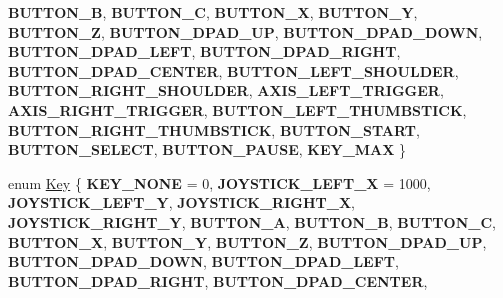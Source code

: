 \begin{DoxyCompactItemize}
\newline
{\bfseries B\+U\+T\+T\+O\+N\+\_\+B}, 
{\bfseries B\+U\+T\+T\+O\+N\+\_\+C}, 
{\bfseries B\+U\+T\+T\+O\+N\+\_\+X}, 
{\bfseries B\+U\+T\+T\+O\+N\+\_\+Y}, 
\newline
{\bfseries B\+U\+T\+T\+O\+N\+\_\+Z}, 
{\bfseries B\+U\+T\+T\+O\+N\+\_\+\+D\+P\+A\+D\+\_\+\+UP}, 
{\bfseries B\+U\+T\+T\+O\+N\+\_\+\+D\+P\+A\+D\+\_\+\+D\+O\+WN}, 
{\bfseries B\+U\+T\+T\+O\+N\+\_\+\+D\+P\+A\+D\+\_\+\+L\+E\+FT}, 
\newline
{\bfseries B\+U\+T\+T\+O\+N\+\_\+\+D\+P\+A\+D\+\_\+\+R\+I\+G\+HT}, 
{\bfseries B\+U\+T\+T\+O\+N\+\_\+\+D\+P\+A\+D\+\_\+\+C\+E\+N\+T\+ER}, 
{\bfseries B\+U\+T\+T\+O\+N\+\_\+\+L\+E\+F\+T\+\_\+\+S\+H\+O\+U\+L\+D\+ER}, 
{\bfseries B\+U\+T\+T\+O\+N\+\_\+\+R\+I\+G\+H\+T\+\_\+\+S\+H\+O\+U\+L\+D\+ER}, 
\newline
{\bfseries A\+X\+I\+S\+\_\+\+L\+E\+F\+T\+\_\+\+T\+R\+I\+G\+G\+ER}, 
{\bfseries A\+X\+I\+S\+\_\+\+R\+I\+G\+H\+T\+\_\+\+T\+R\+I\+G\+G\+ER}, 
{\bfseries B\+U\+T\+T\+O\+N\+\_\+\+L\+E\+F\+T\+\_\+\+T\+H\+U\+M\+B\+S\+T\+I\+CK}, 
{\bfseries B\+U\+T\+T\+O\+N\+\_\+\+R\+I\+G\+H\+T\+\_\+\+T\+H\+U\+M\+B\+S\+T\+I\+CK}, 
\newline
{\bfseries B\+U\+T\+T\+O\+N\+\_\+\+S\+T\+A\+RT}, 
{\bfseries B\+U\+T\+T\+O\+N\+\_\+\+S\+E\+L\+E\+CT}, 
{\bfseries B\+U\+T\+T\+O\+N\+\_\+\+P\+A\+U\+SE}, 
{\bfseries K\+E\+Y\+\_\+\+M\+AX}
 \}
\item 
enum \hyperlink{classController_afdf85a1e7a9a3f5943935ac99fb76906}{Key} \{ \newline
{\bfseries K\+E\+Y\+\_\+\+N\+O\+NE} = 0, 
{\bfseries J\+O\+Y\+S\+T\+I\+C\+K\+\_\+\+L\+E\+F\+T\+\_\+X} = 1000, 
{\bfseries J\+O\+Y\+S\+T\+I\+C\+K\+\_\+\+L\+E\+F\+T\+\_\+Y}, 
{\bfseries J\+O\+Y\+S\+T\+I\+C\+K\+\_\+\+R\+I\+G\+H\+T\+\_\+X}, 
\newline
{\bfseries J\+O\+Y\+S\+T\+I\+C\+K\+\_\+\+R\+I\+G\+H\+T\+\_\+Y}, 
{\bfseries B\+U\+T\+T\+O\+N\+\_\+A}, 
{\bfseries B\+U\+T\+T\+O\+N\+\_\+B}, 
{\bfseries B\+U\+T\+T\+O\+N\+\_\+C}, 
\newline
{\bfseries B\+U\+T\+T\+O\+N\+\_\+X}, 
{\bfseries B\+U\+T\+T\+O\+N\+\_\+Y}, 
{\bfseries B\+U\+T\+T\+O\+N\+\_\+Z}, 
{\bfseries B\+U\+T\+T\+O\+N\+\_\+\+D\+P\+A\+D\+\_\+\+UP}, 
\newline
{\bfseries B\+U\+T\+T\+O\+N\+\_\+\+D\+P\+A\+D\+\_\+\+D\+O\+WN}, 
{\bfseries B\+U\+T\+T\+O\+N\+\_\+\+D\+P\+A\+D\+\_\+\+L\+E\+FT}, 
{\bfseries B\+U\+T\+T\+O\+N\+\_\+\+D\+P\+A\+D\+\_\+\+R\+I\+G\+HT}, 
{\bfseries B\+U\+T\+T\+O\+N\+\_\+\+D\+P\+A\+D\+\_\+\+C\+E\+N\+T\+ER}, 
\newline

\end{DoxyCompactItemize}
